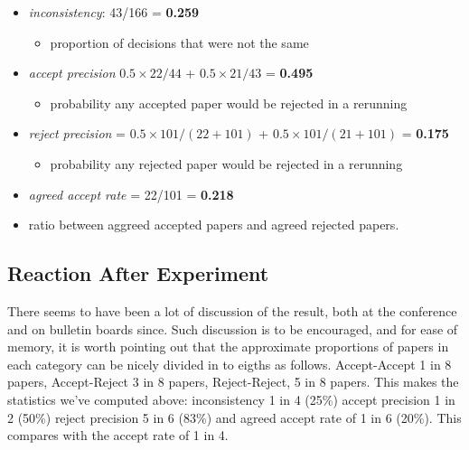 \documentclass[a4paperpaper,]{article}
\providecommand{\tightlist}{%
  \setlength{\itemsep}{0pt}\setlength{\parskip}{0pt}}
\begin{document}
\begin{itemize}
\tightlist
\item
  \emph{inconsistency}: 43/166 = \textbf{0.259}

  \begin{itemize}
  \tightlist
  \item
    proportion of decisions that were not the same
  \end{itemize}
\item
  \emph{accept precision} \(0.5 \times 22/44\) + \(0.5 \times 21/43\) =
  \textbf{0.495}

  \begin{itemize}
  \tightlist
  \item
    probability any accepted paper would be rejected in a rerunning
  \end{itemize}
\item
  \emph{reject precision} = \(0.5\times 101/(22+101)\) +
  \(0.5\times 101/(21 + 101)\) = \textbf{0.175}

  \begin{itemize}
  \tightlist
  \item
    probability any rejected paper would be rejected in a rerunning
  \end{itemize}
\item
  \emph{agreed accept rate} = 22/101 = \textbf{0.218}
\item
  ratio between aggreed accepted papers and agreed rejected papers.
\end{itemize}

\hypertarget{reaction-after-experiment}{%
\subsection{Reaction After Experiment}\label{reaction-after-experiment}}

\begin{flushright}
\end{flushright}

There seems to have been a lot of discussion of the result, both at the
conference and on bulletin boards since. Such discussion is to be
encouraged, and for ease of memory, it is worth pointing out that the
approximate proportions of papers in each category can be nicely divided
in to eigths as follows. Accept-Accept 1 in 8 papers, Accept-Reject 3 in
8 papers, Reject-Reject, 5 in 8 papers. This makes the statistics we've
computed above: inconsistency 1 in 4 (25\%) accept precision 1 in 2
(50\%) reject precision 5 in 6 (83\%) and agreed accept rate of 1 in 6
(20\%). This compares with the accept rate of 1 in 4.
\end{document}

